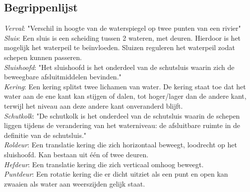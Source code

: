 \documentclass[../verslag.tex]{subfiles}
\begin{document}
\subsection{Begrippenlijst}
\emph{Verval}: "Verschil in hoogte van de waterspiegel op twee punten van een rivier" \cite{dvd_verval}\\
\emph{Sluis}: Een sluis is een scheiding tussen 2 wateren, met deuren. Hierdoor is het mogelijk het waterpeil te beïnvloeden. Sluizen reguleren het waterpeil zodat schepen kunnen passeren. \cite{rws_2022}\\
\emph{Sluishoofd}: "Het sluishoofd is het onderdeel van de schutsluis waarin zich de beweegbare afsluitmiddelen bevinden." \cite{bezuijen_2000}\\
\emph{Kering}: Een kering splitst twee lichamen van water. De kering staat toe dat het water aan de ene kant kan stijgen of dalen, tot hoger/lager dan de andere kant, terwijl het niveau aan deze andere kant onveranderd blijft. \cite{rws_2018}\\
\emph{Schutkolk}: "De schutkolk is het onderdeel van de schutsluis waarin de schepen liggen tijdens de verandering van het waterniveau: de afsluitbare ruimte in de definitie van de schutsluis." \cite{bezuijen_2000}\\
\emph{Roldeur}: Een translatie kering die zich horizontaal beweegt, loodrecht op het sluishoofd. Kan bestaan uit één of twee deuren. \cite{bezuijen_2000}\\
\emph{Hefdeur}: Een translatie kering die zich verticaal omhoog beweegt. \cite{bezuijen_2000}\\
\emph{Puntdeur}: Een rotatie kering die er dicht uitziet als een punt en open kan zwaaien als water aan weerszijden gelijk staat. \cite{bezuijen_2000}
\end{document}
